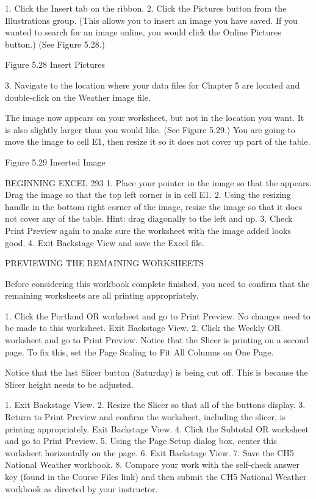 1. Click the Insert tab on the ribbon.
2. Click the Pictures button from the Illustrations group. (This allows you to insert an image you
have saved. If you wanted to search for an image online, you would click the Online Pictures
button.) (See Figure 5.28.)




Figure 5.28 Insert Pictures


3. Navigate to the location where your data files for Chapter 5 are located and double-click on the
Weather image file.

The image now appears on your worksheet, but not in the location you want. It is also slightly larger
than you would like. (See Figure 5.29.) You are going to move the image to cell E1, then resize it so it
does not cover up part of the table.




Figure 5.29 Inserted Image

BEGINNING EXCEL 293
1. Place your pointer in the image so that the     appears. Drag the image so that the top left corner
is in cell E1.
2. Using the resizing handle in the bottom right corner of the image, resize the image so that it
does not cover any of the table. Hint: drag diagonally to the left and up.
3. Check Print Preview again to make sure the worksheet with the image added looks good.
4. Exit Backstage View and save the Excel file.

PREVIEWING THE REMAINING WORKSHEETS

Before considering this workbook complete finished, you need to confirm that the remaining
worksheets are all printing appropriately.

1. Click the Portland OR worksheet and go to Print Preview. No changes need to be made to this
worksheet. Exit Backstage View.
2. Click the Weekly OR worksheet and go to Print Preview. Notice that the Slicer is printing on a
second page. To fix this, set the Page Scaling to Fit All Columns on One Page.

Notice that the last Slicer button (Saturday) is being cut off. This is because the Slicer height needs to
be adjusted.

1. Exit Backstage View.
2. Resize the Slicer so that all of the buttons display.
3. Return to Print Preview and confirm the worksheet, including the slicer, is printing
appropriately. Exit Backstage View.
4. Click the Subtotal OR worksheet and go to Print Preview.
5. Using the Page Setup dialog box, center this worksheet horizontally on the page.
6. Exit Backstage View.
7. Save the CH5 National Weather workbook.
8. Compare your work with the self-check answer key (found in the Course Files link) and then
submit the CH5 National Weather workbook as directed by your instructor.


